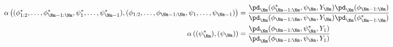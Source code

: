 \begin{align}
  \alpha\left(
    (\phi_{1:2}^{*}, \ldots, \phi_{\Nm - 1:\Nm}^{*}, \psi_{1}^{*}, \ldots, \psi_{\Nm - 1}^{*}),
    (\phi_{1:2}, \ldots, \phi_{\Nm - 1:\Nm}, \psi_{1}, \ldots, \psi_{\Nm - 1})
  \right)
  &= 
  \frac {
    \pd_{\Nm}(\phi_{\Nm - 1:\Nm}^{*}, \psi_{\Nm}, Y_{\Nm})
    \pd_{\Nm}(\phi_{\Nm - 1:\Nm})
  } {
    \pd_{\Nm}(\phi_{\Nm - 1:\Nm}, \psi_{\Nm}, Y_{\Nm})
    \pd_{\Nm}(\phi_{\Nm - 1:\Nm}^{*})
  } \\ 
  \alpha\left(
    (\psi_{\Nm}^{*}),
    (\psi_{\Nm})
  \right)
  &=  
  \frac {
    \pd_{\Nm}(\phi_{\Nm - 1:\Nm}, \psi_{\Nm}^{*}, Y_{1})
  } {
    \pd_{\Nm}(\phi_{\Nm - 1:\Nm}, \psi_{\Nm}, Y_{1})
  } 
  \label{eqn:stage-M-acceptance-probabilities}
\end{align}